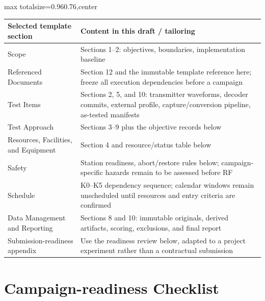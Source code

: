 \documentclass[11pt,a4paper]{article}
\newlength{\tableavail}
\renewcommand{\arraystretch}{1.13}
\begin{document}
\begin{landscape}\thispagestyle{plain}\centering
\setlength{\tabcolsep}{5pt}\renewcommand{\arraystretch}{1.25}
\setlength{\tableavail}{\dimexpr\linewidth-2\tabcolsep\relax}
\begin{adjustbox}{max totalsize={0.96\linewidth}{0.76\textheight},center}
\begin{tabular}{@{}>{\raggedright\arraybackslash}p{0.29\tableavail}>{\raggedright\arraybackslash}p{0.71\tableavail}@{}}
\toprule
\textbf{Selected template section} & \textbf{Content in this draft / tailoring}\\
\midrule
Scope & Sections 1--2: objectives, boundaries, implementation baseline\\[5pt]
Referenced Documents & Section 12 and the immutable template reference here; freeze all execution dependencies before a campaign\\[5pt]
Test Items & Sections 2, 5, and 10: transmitter waveforms, decoder commits, external profile, capture/conversion pipeline, as-tested manifests\\[5pt]
Test Approach & Sections 3--9 plus the objective records below\\[5pt]
Resources, Facilities, and Equipment & Section 4 and resource/status table below\\[5pt]
Safety & Station readiness, abort/restore rules below; campaign-specific hazards remain to be assessed before RF\\[5pt]
Schedule & K0--K5 dependency sequence; calendar windows remain unscheduled until resources and entry criteria are confirmed\\[5pt]
Data Management and Reporting & Sections 8 and 10: immutable originals, derived artifacts, scoring, exclusions, and final report\\[5pt]
Submission-readiness appendix & Use the readiness review below, adapted to a project experiment rather than a contractual submission\\[5pt]
\bottomrule
\end{tabular}
\end{adjustbox}
\end{landscape}

\clearpage
\section{Campaign-readiness Checklist}
\label{app:checklist}
\end{document}
